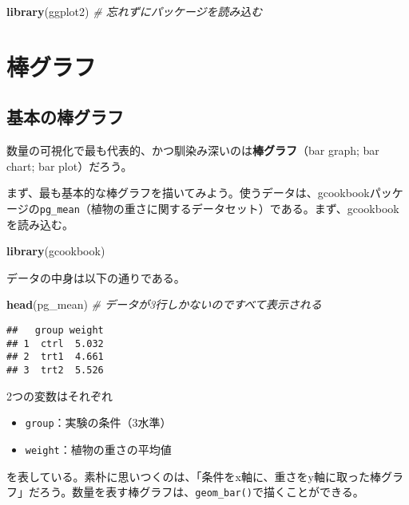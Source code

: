 \documentclass[]{book}
\newenvironment{Shaded}{\begin{snugshade}}{\end{snugshade}}
\newcommand{\KeywordTok}[1]{\textcolor[rgb]{0.13,0.29,0.53}{\textbf{#1}}}
\newcommand{\CommentTok}[1]{\textcolor[rgb]{0.56,0.35,0.01}{\textit{#1}}}
\newcommand{\NormalTok}[1]{#1}
\begin{document}
\begin{Shaded}
\begin{Highlighting}[]
\KeywordTok{library}\NormalTok{(ggplot2) }\CommentTok{# 忘れずにパッケージを読み込む}
\end{Highlighting}
\end{Shaded}

\section{棒グラフ}

\subsection{基本の棒グラフ}

数量の可視化で最も代表的、かつ馴染み深いのは\textbf{棒グラフ}（bar
graph; bar chart; bar plot）だろう。

まず、最も基本的な棒グラフを描いてみよう。使うデータは、gcookbookパッケージの\texttt{pg\_mean}（植物の重さに関するデータセット）である。まず、gcookbookを読み込む。

\begin{Shaded}
\begin{Highlighting}[]
\KeywordTok{library}\NormalTok{(gcookbook)}
\end{Highlighting}
\end{Shaded}

データの中身は以下の通りである。

\begin{Shaded}
\begin{Highlighting}[]
\KeywordTok{head}\NormalTok{(pg_mean) }\CommentTok{# データが3行しかないのですべて表示される}
\end{Highlighting}
\end{Shaded}

\begin{verbatim}
##   group weight
## 1  ctrl  5.032
## 2  trt1  4.661
## 3  trt2  5.526
\end{verbatim}

2つの変数はそれぞれ

\begin{itemize}
\item
  \texttt{group}：実験の条件（3水準）
\item
  \texttt{weight}：植物の重さの平均値
\end{itemize}

を表している。素朴に思いつくのは、「条件をx軸に、重さをy軸に取った棒グラフ」だろう。数量を表す棒グラフは、\texttt{geom\_bar()}で描くことができる。
\end{document}
